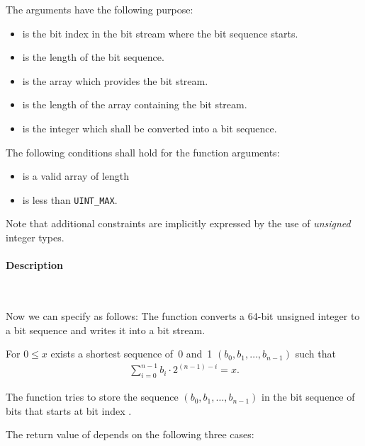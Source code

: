 The arguments have the following purpose:

\begin{itemize}
    \item {} is the bit index in the bit stream 
    where the bit sequence starts.
    \item {} is the length of the bit sequence.
    \item {} is the array which provides the bit stream.
    \item {} is the length of the array 
    containing the bit stream. 
    \item {} is the integer which shall be converted into a bit sequence.
\end{itemize}

The following conditions shall hold for the function arguments:

\begin{itemize}
\item {} is a valid array of length 

\item {} is less than \verb"UINT_MAX".
\end{itemize}

Note that additional constraints are implicitly expressed by the use
of \emph{unsigned} integer types.


\paragraph{Description}~

Now we can specify \poke as follows:
The function \poke converts a 64-bit unsigned integer to a bit sequence and 
writes it into a bit stream.

For $0 \leq x$ exists a shortest sequence of~0 and~1
$(b_0, b_1,\ldots,b_{n - 1})$
such that
\begin{align}
    \sum_{i=0}^{n-1} b_i \cdot 2^{(n - 1) - i} = x.
\end{align}

The function \poke tries to store the sequence $(b_0, b_1,\ldots,b_{n - 1})$
in the bit sequence of  bits that starts
at bit index .

The return value of \poke depends on the following three cases:


